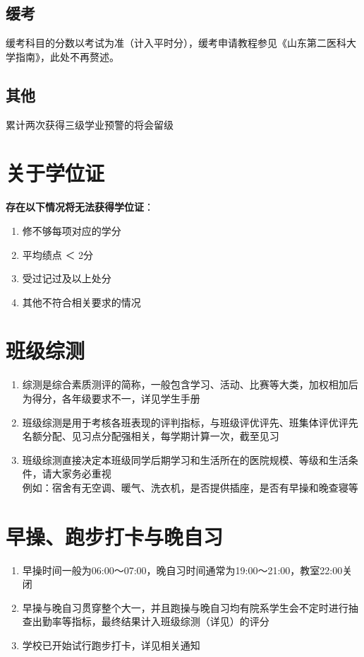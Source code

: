 \subsection[缓考]{缓考}
缓考科目的分数以考试为准（计入平时分），缓考申请教程参见《山东第二医科大学指南》，此处不再赘述。

\subsection[其他]{其他}
累计两次获得三级学业预警的将会留级

\section[关于学位证]{关于学位证}
\textbf{存在以下情况将无法获得学位证}：
\begin{enumerate}
    \item 修不够每项对应的学分
    \item 平均绩点 ＜ 2分
    \item 受过记过及以上处分
    \item 其他不符合相关要求的情况
\end{enumerate}

\section[班级综测]{班级综测}
\label{class_evaluation}
\begin{enumerate}
    \item 综测是综合素质测评的简称，一般包含学习、活动、比赛等大类，加权相加后为得分，各年级要求不一，详见学生手册
    \item 班级综测是用于考核各班表现的评判指标，与班级评优评先、班集体评优评先名额分配、见习点分配\footnotemark 强相关，每学期计算一次，截至见习
    \item 班级综测直接决定本班级同学后期学习和生活所在的医院规模、等级和生活条件，请大家务必重视\\
          例如：宿舍有无空调、暖气、洗衣机，是否提供插座，是否有早操和晚查寝\footnotemark 等
\end{enumerate}

\section[早操、跑步打卡与晚自习]{早操、跑步打卡与晚自习}
\begin{enumerate}
    \item 早操时间一般为06:00～07:00，晚自习时间通常为19:00～21:00，教室22:00关闭
    \item 早操与晚自习贯穿整个大一\footnotemark，并且跑操与晚自习均有院系学生会不定时进行抽查出勤率等指标，最终结果计入班级综测（详见）的评分
    \item 学校已开始试行跑步打卡，详见相关通知
\end{enumerate}


